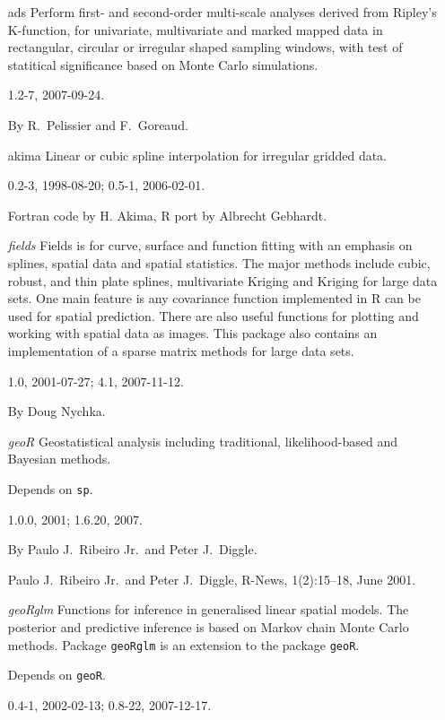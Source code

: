 \documentclass[12pt]{article}
\begin{document}
\begin{itemize}
\item[ads]
Perform first- and second-order multi-scale analyses derived from
Ripley's K-function, for univariate, multivariate and marked mapped data
in rectangular, circular or irregular shaped sampling windows, with test
of statitical significance based on Monte Carlo simulations.

1.2-7, 2007-09-24.

By R.\ Pelissier and F.\ Goreaud.

\item[akima]
Linear or cubic spline interpolation for irregular gridded data.

0.2-3, 1998-08-20; 0.5-1, 2006-02-01.

Fortran code by H. Akima, R port by Albrecht Gebhardt.

\item[\emph{fields}]
Fields is for curve, surface and function fitting with an emphasis on
splines, spatial data and spatial statistics. The major methods include
cubic, robust, and thin plate splines, multivariate Kriging and Kriging
for large data sets. One main feature is any covariance function
implemented in R can be used for spatial prediction. There are also
useful functions for plotting and working with spatial data as images.
This package also contains an implementation of a sparse matrix methods
for large data sets.

1.0, 2001-07-27; 4.1, 2007-11-12.

By Doug Nychka.

\item[\emph{geoR}]
Geostatistical analysis including traditional, likelihood-based and
Bayesian methods.

Depends on \texttt{sp}.

1.0.0, 2001; 1.6.20, 2007.


By Paulo J.\ Ribeiro Jr.\ and Peter J.\ Diggle.

Paulo J.\ Ribeiro Jr.\  and Peter J.\ Diggle, R-News, 1(2):15--18, June 2001.

\item[\emph{geoRglm}]
Functions for inference in generalised linear spatial models. The
posterior and predictive inference is based on Markov chain Monte Carlo
methods. Package \texttt{geoRglm} is an extension to the package
\texttt{geoR}.

Depends on \texttt{geoR}.

0.4-1, 2002-02-13; 0.8-22, 2007-12-17.


\end{itemize}
\end{document}
